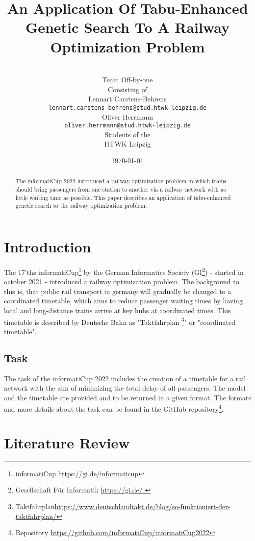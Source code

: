 \documentclass[a4paper,12pt,parskip]{article}
\title{An Application Of Tabu-Enhanced Genetic Search To A Railway Optimization Problem}
\author{
    \\ [1cm]
    \Large Team Off-by-one \\ [0.5cm]
    \normalsize Consisting of \\ [0.5cm]
    \normalsize Lennart Carstens-Behrens \\
    \texttt{lennart.carstens-behrens@stud.htwk-leipzig.de} \\
    \normalsize Oliver Herrmann \\
    \texttt{oliver.herrmann@stud.htwk-leipzig.de} \\ [0.5cm]
    \normalsize Students of the \\ [0.5cm]
    \normasize HTWK Leipzig \\ [1.5cm]
}
\date{\today}
\begin{document}
\maketitle

\vfill

\begin{abstract}
The informatiCup 2022 introduced a railway optimization problem in which trains 
should bring passengers from one station to another via a railway network with 
as little waiting time as possible. This paper describes an application of 
tabu-enhanced genetic search to the railway optimization problem.
\end{abstract}

\newpage

\tableofcontents


\section{Introduction}

The 17'ths informatiCup\footnote{informatiCup \url{https://gi.de/informaticup}} 
by the German Informatics Society (GI\footnote{Gesellschaft Für Informatik \url{ https://gi.de/ }}) - 
started in october 2021 - introduced a railway optimization problem. The 
background to this is, that public rail transport in germany will gradually be 
changed to a coordinated timetable, which aims to reduce passenger waiting times 
by having local and long-distance trains arrive at key hubs at coordinated times. 
This timetable is described by Deutsche Bahn as 
"Taktfahrplan \footnote{Taktfahrplan\url{https://www.deutschlandtakt.de/blog/so-funktioniert-der-taktfahrplan/}}" 
or "coordinated timetable".

\subsection{Task}

The task of the informatiCup 2022 includes the creation of a timetable for a rail 
network with the aim of minimizing the total delay of all passengers. The model 
and the timetable are provided and to be returned in a given format. The formats 
and more details about the task can be found in the GitHub 
repository\footnote{Repository \url{https://github.com/informatiCup/informatiCup2022}}.

\section{Literature Review}
\end{document}
